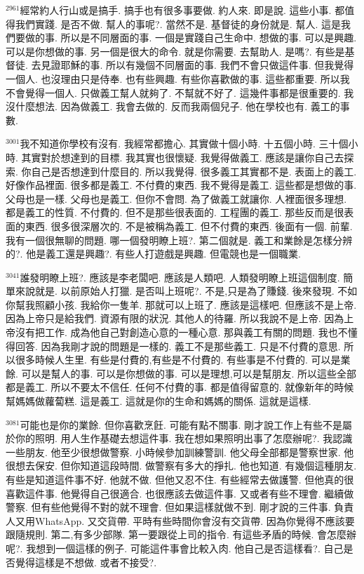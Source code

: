 \documentclass{book}
\begin{document}
$^{2961}$經常約人行山或是搞手.
搞手也有很多事要做.
約人來.
即是說.
這些小事.
都值得我們實踐.
是否不做.
幫人的事呢?.
當然不是.
基督徒的身份就是.
幫人.
這是我們要做的事.
所以是不同層面的事.
一個是實踐自己生命中.
想做的事.
可以是興趣.
可以是你想做的事.
另一個是很大的命令.
就是你需要.
去幫助人.
是嗎?.
有些是基督徒.
去見證耶穌的事.
所以有幾個不同層面的事.
我們不會只做這件事.
但我覺得一個人.
也沒理由只是侍奉.
也有些興趣.
有些你喜歡做的事.
這些都重要.
所以我不會覺得一個人.
只做義工幫人就夠了.
不幫就不好了.
這幾件事都是很重要的.
我沒什麼想法.
因為做義工.
我會去做的.
反而我兩個兒子.
他在學校也有.
義工的事數.

$^{3001}$我不知道你學校有沒有.
我經常都擔心.
其實做十個小時.
十五個小時.
三十個小時.
其實對於想達到的目標.
我其實也很懷疑.
我覺得做義工.
應該是讓你自己去探索.
你自己是否想達到什麼目的.
所以我覺得.
很多義工其實都不是.
表面上的義工.
好像作品裡面.
很多都是義工.
不付費的東西.
我不覺得是義工.
這些都是想做的事.
父母也是一樣.
父母也是義工.
但你不會問.
為了做義工就讓你.
人裡面很多理想.
都是義工的性質.
不付費的.
但不是那些很表面的.
工程團的義工.
那些反而是很表面的東西.
很多很深層次的.
不是被稱為義工.
但不付費的東西.
後面有一個.
前輩.
我有一個很無聊的問題.
哪一個發明瞭上班?.
第二個就是.
義工和業餘是怎樣分辨的?.
他是義工還是興趣?.
有些人打遊戲是興趣.
但電競也是一個職業.

$^{3041}$誰發明瞭上班?.
應該是李老闆吧.
應該是人類吧.
人類發明瞭上班這個制度.
簡單來說就是.
以前原始人打獵.
是否叫上班呢?.
不是,只是為了賺錢.
後來發現.
不如你幫我照顧小孩.
我給你一隻羊.
那就可以上班了.
應該是這樣吧.
但應該不是上帝.
因為上帝只是給我們.
資源有限的狀況.
其他人的待羅.
所以我說不是上帝.
因為上帝沒有把工作.
成為他自己對創造心意的一種心意.
那與義工有關的問題.
我也不懂得回答.
因為我剛才說的問題是一樣的.
義工不是那些義工.
只是不付費的意思.
所以很多時候人生里.
有些是付費的,有些是不付費的.
有些事是不付費的.
可以是業餘.
可以是幫人的事.
可以是你想做的事.
可以是理想,可以是幫朋友.
所以這些全部都是義工.
所以不要太不信任.
任何不付費的事.
都是值得留意的.
就像新年的時候幫媽媽做蘿蔔糕.
這是義工.
這就是你的生命和媽媽的關係.
這就是這樣.

$^{3081}$可能也是你的業餘.
但你喜歡烹飪.
可能有點不關事.
剛才說工作上有些不是屬於你的照明.
用人生作基礎去想這件事.
我在想如果照明出事了怎麼辦呢?.
我認識一些朋友.
他至少很想做警察.
小時候參加訓練警訓.
他父母全部都是警察世家.
他很想去保安.
但你知道這段時間.
做警察有多大的掙扎.
他也知道.
有幾個這種朋友.
有些是知道這件事不好.
他就不做.
但他又忍不住.
有些經常去做護警.
但他真的很喜歡這件事.
他覺得自己很適合.
也很應該去做這件事.
又或者有些不理會.
繼續做警察.
但有些他覺得不對的就不理會.
但如果這樣就做不到.
剛才說的三件事.
負責人又用WhatsApp.
又交貨帶.
平時有些時間你會沒有交貨帶.
因為你覺得不應該要跟隨規則.
第二,有多少部隊.
第一要跟從上司的指令.
有這些矛盾的時候.
會怎麼辦呢?.
我想到一個這樣的例子.
可能這件事會比較入肉.
他自己是否這樣看?.
自己是否覺得這樣是不想做.
或者不接受?.
\end{document}

